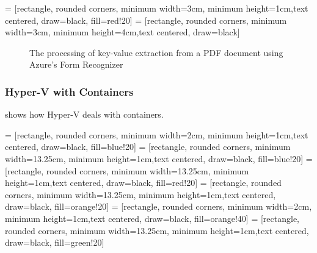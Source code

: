  = [rectangle, rounded corners, minimum width=3cm, minimum height=1cm,text centered, draw=black, fill=red!20]
 = [rectangle, rounded corners, minimum width=3cm, minimum height=4cm,text centered, draw=black]
\begin{figure}[!ht]
\caption{The processing of key-value extraction from a PDF document using Azure's Form Recognizer}
  \label{fig:processAnInvoice}
\end{figure}
\FloatBarrier
\subsubsection{Hyper-V with Containers}
  shows how Hyper-V deals with containers.
 
 = [rectangle, rounded corners, minimum width=2cm, minimum height=1cm,text centered, draw=black, fill=blue!20]
 = [rectangle, rounded corners, minimum width=13.25cm, minimum height=1cm,text centered, draw=black, fill=blue!20]
 = [rectangle, rounded corners, minimum width=13.25cm, minimum height=1cm,text centered, draw=black, fill=red!20]
 = [rectangle, rounded corners, minimum width=13.25cm, minimum height=1cm,text centered, draw=black, fill=orange!20]
 = [rectangle, rounded corners, minimum width=2cm, minimum height=1cm,text centered, draw=black, fill=orange!40]
 = [rectangle, rounded corners, minimum width=13.25cm, minimum height=1cm,text centered, draw=black, fill=green!20]

